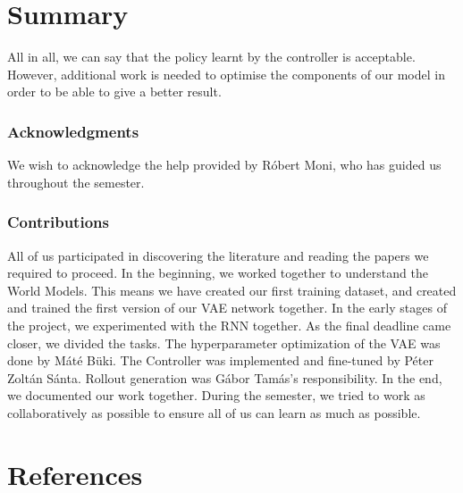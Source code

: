 \documentclass{article}
\begin{document}
\section{Summary}
All in all, we can say that the policy learnt by the controller is acceptable. However, additional work is needed to optimise the components of our model in order to be able to give a better result.


\subsubsection*{Acknowledgments}

We wish to acknowledge the help provided by Róbert Moni, who has guided us throughout the semester.

\subsubsection*{Contributions}
All of us participated in discovering the literature and reading the papers we required to proceed. In the beginning, we worked together to understand the World Models. This means we have created our first training dataset, and created and trained the first version of our VAE network together. In the early stages of the project, we experimented with the RNN together. As the final deadline came closer, we divided the tasks. The hyperparameter optimization of the VAE was done by Máté Büki. The Controller was implemented and fine-tuned by Péter Zoltán Sánta. Rollout generation was Gábor Tamás's responsibility. In the end, we documented our work together. During the semester, we tried to work as collaboratively as possible to ensure all of us can learn as much as possible.


\section*{References}


\small


\end{document}
